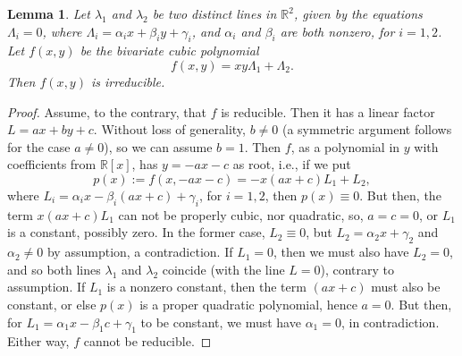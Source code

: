 \documentclass[12pt]{article}
\def\reals{{\mathbb R}}
\newtheorem{lemma}[theorem]{Lemma}
\begin{document}
\begin{lemma} \label{lem:irr1_n}
Let $\lambda_1$ and $\lambda_2$ be two distinct lines in
$\reals^2$, given by the equations $\Lambda_i = 0$, where
$\Lambda_i = \alpha_i x + \beta_i y + \gamma_i$,
and $\alpha_i$ and $\beta_i$ are both nonzero, for $i = 1,2$.
Let $f(x,y)$ be the bivariate cubic polynomial
\begin{equation*}
f(x,y) = xy\Lambda_1 + \Lambda_2.
\end{equation*}
Then $f(x,y)$ is irreducible.
\end{lemma}
\begin{proof}
Assume, to the contrary, that $f$ is reducible. Then it has a
linear factor $L = ax + by + c$. Without loss of generality,
$b \ne 0$ (a symmetric
argument follows for the case $a \ne 0$), so we can assume $b = 1$.
Then $f$, as a polynomial in $y$ with coefficients from $\reals[x]$,
has $y = - ax - c$ as root, i.e., if we put
$$p(x) := f(x, -ax-c) = -x(ax+c)L_1 + L_2,$$
where $L_i = \alpha_i x - \beta_i (ax+c) + \gamma_i$, for $i = 1,2$,
then $p(x) \equiv 0$. But then, the term $x(ax+c)L_1$ can not be
properly cubic, nor quadratic, so, $a=c=0$, or $L_1$ is a
constant, possibly zero. In the former case, $L_2 \equiv 0$, but
$L_2 = \alpha_2x + \gamma_2$ and $\alpha_2 \ne 0$ by assumption,
a contradiction.
If $L_1 = 0$, then we
must also have $L_2 = 0$, and so both lines $\lambda_1$ and
$\lambda_2$ coincide (with the line $L = 0$), contrary to assumption.
If $L_1$ is a nonzero constant, then the term $(ax+c)$ must also
be constant, or else $p(x)$ is a proper quadratic polynomial,
hence $a=0$. But then, for $L_1 = \alpha_1 x - \beta_1 c + \gamma_1$
to be constant, we must have $\alpha_1 = 0$, in contradiction.
Either way, $f$ cannot be reducible.
\end{proof}
\end{document}
